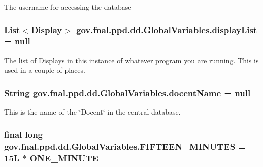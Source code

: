 The username for accessing the database \hypertarget{classgov_1_1fnal_1_1ppd_1_1dd_1_1GlobalVariables_a30efdc2ab60dd04f76dc1210b8447426}{
\subsubsection[{display\-List}]{\setlength{\rightskip}{0pt plus 5cm}List$<${\bf Display}$>$ gov.\-fnal.\-ppd.\-dd.\-Global\-Variables.\-display\-List = null\hspace{0.3cm}{\ttfamily [static]}}}\label{classgov_1_1fnal_1_1ppd_1_1dd_1_1GlobalVariables_a30efdc2ab60dd04f76dc1210b8447426}
The list of Displays in this instance of whatever program you are running. This is used in a couple of places. \hypertarget{classgov_1_1fnal_1_1ppd_1_1dd_1_1GlobalVariables_a1a8699e7b2ec1e9cad652869fedafa2b}{
\subsubsection[{docent\-Name}]{\setlength{\rightskip}{0pt plus 5cm}String gov.\-fnal.\-ppd.\-dd.\-Global\-Variables.\-docent\-Name = null\hspace{0.3cm}{\ttfamily [static]}}}\label{classgov_1_1fnal_1_1ppd_1_1dd_1_1GlobalVariables_a1a8699e7b2ec1e9cad652869fedafa2b}
This is the name of the \char`\"{}\-Docent\char`\"{} in the central database. \hypertarget{classgov_1_1fnal_1_1ppd_1_1dd_1_1GlobalVariables_ae09d2d42603daf3b4d5fccd1c489a93b}{
\subsubsection[{F\-I\-F\-T\-E\-E\-N\-\_\-\-M\-I\-N\-U\-T\-E\-S}]{\setlength{\rightskip}{0pt plus 5cm}final long gov.\-fnal.\-ppd.\-dd.\-Global\-Variables.\-F\-I\-F\-T\-E\-E\-N\-\_\-\-M\-I\-N\-U\-T\-E\-S = 15\-L $\ast$ O\-N\-E\-\_\-\-M\-I\-N\-U\-T\-E\hspace{0.3cm}{\ttfamily [static]}}}\label{classgov_1_1fnal_1_1ppd_1_1dd_1_1GlobalVariables_ae09d2d42603daf3b4d5fccd1c489a93b}
